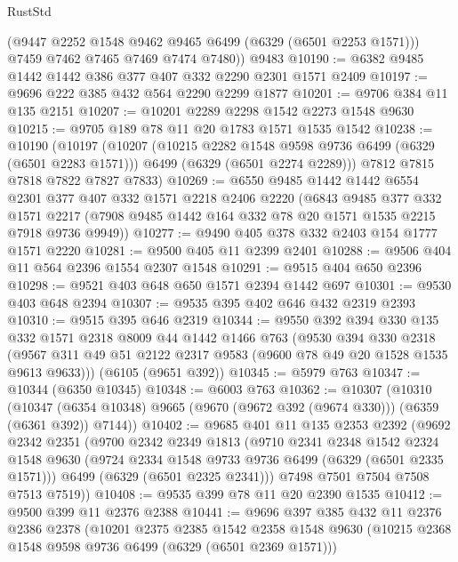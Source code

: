 \begin{lexlean}{RustStd}
\begin{coremodule}
{\begin{coremodule}
{{{{{{{{{{{{{{{{{{{{{{{{{{{{{{{{{{{        (@9447 @2252 @1548 @9462 @9465 @6499 (@6329 (@6501 @2253 @1571)))
        @7459
        @7462
        @7465
        @7469
        @7474
        @7480))
    @9483
@10190 := @6382 @9485 @1442 @1442 @386 @377 @407 @332 @2290 @2301 @1571 @2409
@10197 := @9696 @222 @385 @432 @564 @2290 @2299 @1877
@10201 := @9706 @384 @11 @135 @2151
@10207 := @10201 @2289 @2298 @1542 @2273 @1548 @9630
@10215 := @9705 @189 @78 @11 @20 @1783 @1571 @1535 @1542
@10238 := @10190
    (@10197
      (@10207
        (@10215 @2282 @1548 @9598 @9736 @6499 (@6329 (@6501 @2283 @1571)))
        @6499
        (@6329 (@6501 @2274 @2289)))
      @7812
      @7815
      @7818
      @7822
      @7827
      @7833)
@10269 := @6550
    @9485
    @1442
    @1442
    @6554
    @2301
    @377
    @407
    @332
    @1571
    @2218
    @2406
    @2220
    (@6843
      @9485
      @377
      @332
      @1571
      @2217
      (@7908 @9485 @1442 @164 @332 @78 @20 @1571 @1535 @2215 @7918 @9736 @9949))
@10277 := @9490 @405 @378 @332 @2403 @154 @1777 @1571 @2220
@10281 := @9500 @405 @11 @2399 @2401
@10288 := @9506 @404 @11 @564 @2396 @1554 @2307 @1548
@10291 := @9515 @404 @650 @2396
@10298 := @9521 @403 @648 @650 @1571 @2394 @1442 @697
@10301 := @9530 @403 @648 @2394
@10307 := @9535 @395 @402 @646 @432 @2319 @2393
@10310 := @9515 @395 @646 @2319
@10344 := @9550
    @392
    @394
    @330
    @135
    @332
    @1571
    @2318
    @8009
    @44
    @1442
    @1466
    @763
    (@9530
      @394
      @330
      @2318
      (@9567 @311 @49 @51 @2122 @2317 @9583 (@9600 @78 @49 @20 @1528 @1535 @9613 @9633)))
    (@6105 (@9651 @392))
@10345 := @5979 @763
@10347 := @10344 (@6350 @10345)
@10348 := @6003 @763
@10362 := @10307
    (@10310
      (@10347 (@6354 @10348) @9665 (@9670 (@9672 @392 (@9674 @330))) (@6359 (@6361 @392)) @7144))
@10402 := @9685
    @401
    @11
    @135
    @2353
    @2392
    (@9692
      @2342
      @2351
      (@9700
        @2342
        @2349
        @1813
        (@9710
          @2341
          @2348
          @1542
          @2324
          @1548
          @9630
          (@9724 @2334 @1548 @9733 @9736 @6499 (@6329 (@6501 @2335 @1571)))
          @6499
          (@6329 (@6501 @2325 @2341)))
        @7498
        @7501
        @7504
        @7508
        @7513
        @7519))
@10408 := @9535 @399 @78 @11 @20 @2390 @1535
@10412 := @9500 @399 @11 @2376 @2388
@10441 := @9696
    @397
    @385
    @432
    @11
    @2376
    @2386
    @2378
    (@10201
      @2375
      @2385
      @1542
      @2358
      @1548
      @9630
      (@10215 @2368 @1548 @9598 @9736 @6499 (@6329 (@6501 @2369 @1571)))
}}}}}}}}}}}}}}}}}}}}}}}}}}}}}}}}}}}
\end{coremodule}}
\end{coremodule}
\end{lexlean}
